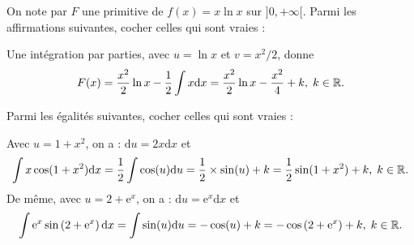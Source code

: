 \begin{question}
On note par $F$ une primitive de $f(x)=x\ln x$ sur $]0,+\infty[$. Parmi les affirmations suivantes, cocher celles qui sont vraies :
\begin{answers}  
\end{answers}
\begin{explanations}
Une intégration par parties, avec $u=\ln x$ et $v=x^2/2$, donne
$$F(x)=\frac{x^2}{2}\ln x-\frac{1}{2}\int x\mathrm{d}x=\frac{x^2}{2}\ln x-\frac{x^2}{4}+k,\; k\in \mathbb{R}.$$
\end{explanations}
\end{question}

\begin{question}
Parmi les égalités suivantes, cocher celles qui sont vraies :
\begin{answers}  
\end{answers}
\begin{explanations}
Avec $u=1+x^2$, on a : $\mathrm{d}u=2x\mathrm{d}x$ et 
$$\int x\cos(1+x^2)\mathrm{d}x=\frac{1}{2}\int \cos (u)\mathrm{d}u=\frac{1}{2}\times \sin (u)+k=\frac{1}{2}\sin(1+x^2)+k,\; k\in \mathbb{R}.$$
De même, avec $u=2+\mathrm{e}^x$, on a : $\mathrm{d}u=\mathrm{e}^x\mathrm{d}x$ et 
$$\int \mathrm{e}^x\sin\left(2+\mathrm{e}^x\right)\mathrm{d}x=\int \sin (u)\mathrm{d}u=-\cos (u)+k=-\cos\left(2+\mathrm{e}^x\right)+k,\; k\in \mathbb{R}.$$
\end{explanations}
\end{question}

